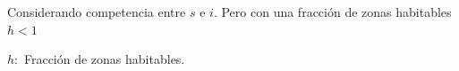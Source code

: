 \documentclass[twocolumn,aps,prl]{revtex4-1}
\begin{document}



Considerando competencia entre $s$ e $i$. Pero con una fracción de zonas habitables $h<1$ 

$h:$ Fracción de zonas habitables.
\end{document}
